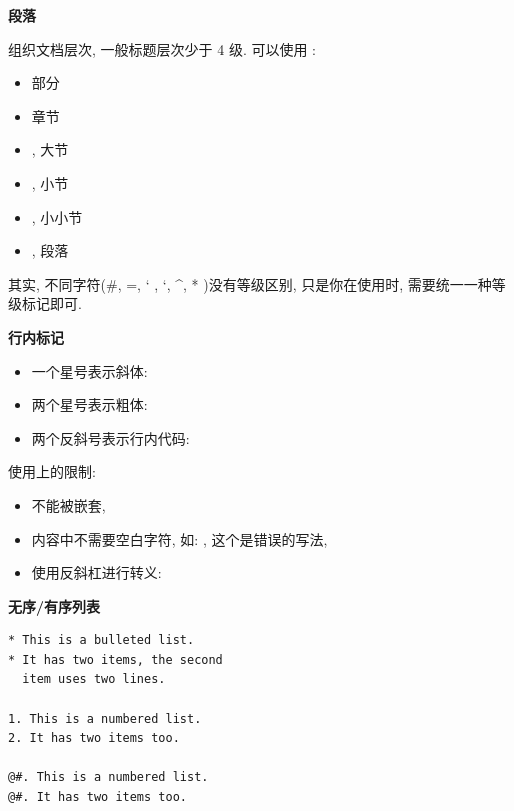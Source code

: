 \documentclass[letterpaper,10pt,english]{sphinxmanual}
\begin{document}
\textbf{段落}

组织文档层次, 一般标题层次少于 4 级. 可以使用 :
\begin{itemize}
\item {}
\code{\#} 部分

\item {}
\code{*} 章节

\item {}
\code{=}, 大节

\item {}
\code{-}, 小节

\item {}
\code{\textasciicircum{}}, 小小节

\item {}
, 段落

\end{itemize}

其实, 不同字符(\#, =, ` , {}`, \textasciicircum{}, * )没有等级区别, 只是你在使用时, 需要统一一种等级标记即可.

\textbf{行内标记}
\begin{itemize}
\item {}
一个星号表示斜体: 

\item {}
两个星号表示粗体: 

\item {}
两个反斜号表示行内代码: 

\end{itemize}

使用上的限制:
\begin{itemize}
\item {}
不能被嵌套,

\item {}
内容中不需要空白字符, 如:  , 这个是错误的写法,

\item {}
使用反斜杠进行转义: 

\end{itemize}

\textbf{无序/有序列表}

\begin{Verbatim}[commandchars=@\[\]]
* This is a bulleted list.
* It has two items, the second
  item uses two lines.

1. This is a numbered list.
2. It has two items too.

@#. This is a numbered list.
@#. It has two items too.
\end{Verbatim}
\end{document}
